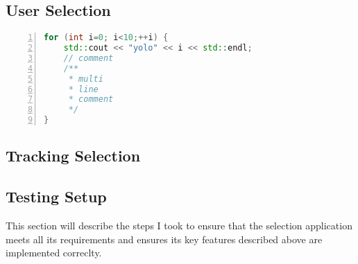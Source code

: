 

\subsection{User Selection}
\label{sec:user_selection}

\begin{lstlisting}[language=C++,numberstyle=\zebra{black!5}{white}{},numbers=left,xleftmargin=2em]
for (int i=0; i<10;++i) {
	std::cout << "yolo" << i << std::endl;
	// comment
	/**
	 * multi
	 * line
	 * comment
	 */
}
\end{lstlisting}

\subsection{Tracking Selection}
\label{sec:tracking_selection}

\subsection{Testing Setup}
\label{sec:testing_setup}
This section will describe the steps I took to ensure that the selection application meets all its requirements and ensures its key features described above are implemented correclty.
